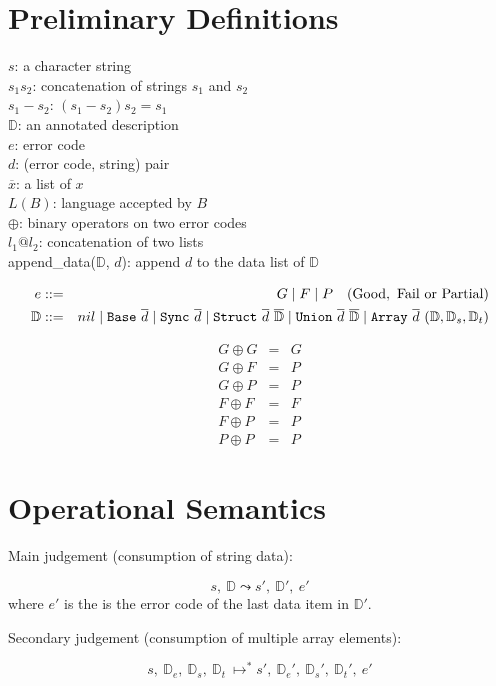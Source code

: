 \documentclass[11pt]{article}
\renewcommand{\bar}[1]{\overline #1}
\newcommand{\base}{{\tt Base}}
\newcommand{\sync}{{\tt Sync}}
\newcommand{\mystruct}{{\tt Struct}}
\newcommand{\myunion}{{\tt Union}}
\newcommand{\myarray}{{\tt Array}}
\newcommand{\D}{{\mathbb D}}
\newcommand{\pa}{{\mapsto^*}}
\begin{document}
\section{Preliminary Definitions}

\noindent
$s$: a character string \\
$s_1 s_2$: concatenation of strings $s_1$ and $s_2$\\
$s_1 - s_2$: $(s_1 - s_2) s_2 = s_1$ \\
$\D$: an annotated description \\
$e$: error code \\
$d$: (error code, string) pair\\
$\bar x$: a list of $x$ \\
$L(B)$: language accepted by $B$\\
$\oplus$: binary operators on two error codes\\
$l_1 @ l_2$: concatenation of two lists\\
append\_data($\D$, $d$): append $d$ to the data list of $\D$

\begin{eqnarray*}
e &::=& G \bnfalt F \bnfalt P ~~~ {\rm (Good,~ Fail~ or~ Partial)}\\
\D &::=& nil \bnfalt \base~ \bar{d} \bnfalt \sync~ \bar{d} \bnfalt \mystruct~ \bar{d}~  \bar{\D} \bnfalt 
\myunion~ \bar{d}~ \bar{\D} \bnfalt \myarray~ \bar{d}~ (\D, \D_s, \D_t)
\end{eqnarray*}

\begin{eqnarray*}
G \oplus G &=& G\\
G \oplus F &=& P\\
G \oplus P &=& P\\
F \oplus F &=& F\\
F \oplus P &=& P\\
P \oplus P &=& P
\end{eqnarray*}

\section{Operational Semantics}
Main judgement (consumption of string data):

\[s,~ \D \leadsto s',~ \D',~ e'
\]
\noindent
where $e'$ is the is the error code of the last data item in $\D'$.

\noindent
Secondary judgement (consumption of multiple array elements):

\[
s, ~\D_e,~ \D_s,~ \D_t~ \pa s',~ \D_e',~ \D_s',~ \D_t',~ e'
\]
\end{document}
